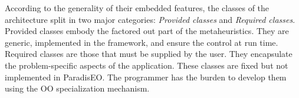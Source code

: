 According to the generality of their embedded features, the classes of the architecture split in two major categories: {\em Provided classes\/} and {\em Required classes\/}. Provided classes embody the factored out part of the metaheuristics. They are generic, implemented in the framework, and ensure the control at run time. Required classes are those that must be supplied by the user. They encapsulate the problem-specific aspects of the application. These classes are fixed but not implemented in Paradis\-EO. The programmer has the burden to develop them using the OO specialization mechanism. 